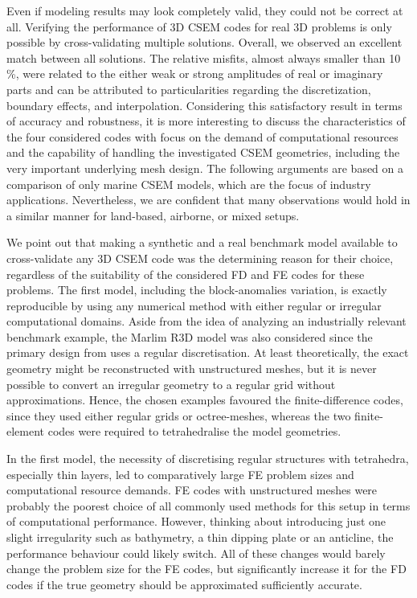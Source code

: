 \documentclass[
    paper,
  ]{geophysics}
\begin{document}
Even if modeling results may look completely valid, they could not be correct
at all. Verifying the performance of 3D CSEM codes for real 3D problems is only
possible by cross-validating multiple solutions. Overall, we observed an
excellent match between all solutions. The relative misfits, almost always
smaller than 10\,\%, were related to the either weak or strong amplitudes of
real or imaginary parts and can be attributed to particularities regarding the
discretization, boundary effects, and interpolation. Considering this
satisfactory result in terms of accuracy and robustness, it is more interesting
to discuss the characteristics of the four considered codes with focus on the
demand of computational resources and the capability of handling the
investigated CSEM geometries, including the very important underlying mesh
design. The following arguments are based on a comparison of only marine CSEM
models, which are the focus of industry applications. Nevertheless, we are
confident that many observations would hold in a similar manner for land-based,
airborne, or mixed setups. 

We point out that making a synthetic and a real benchmark model available to
cross-validate any 3D CSEM code was the determining reason for their choice,
regardless of the suitability of the considered FD and FE codes for these
problems. The first model, including the block-anomalies variation, is exactly
reproducible by using any numerical method with either regular or irregular
computational domains. Aside from the idea of analyzing an industrially
relevant benchmark example, the Marlim R3D model was also considered since the
primary design from \cite{GEO.19.Correa} uses a regular discretisation. At
least theoretically, the exact geometry might be reconstructed with
unstructured meshes, but it is never possible to convert an irregular geometry
to a regular grid without approximations. Hence, the chosen examples favoured
the finite-difference codes, since they used either regular grids or
octree-meshes, whereas the two finite-element codes were required to
tetrahedralise the model geometries.

In the first model, the necessity of discretising regular structures with
tetrahedra, especially thin layers, led to comparatively large FE problem sizes
and computational resource demands. FE codes with unstructured meshes were
probably the poorest choice of all commonly used methods for this setup in
terms of computational performance. However, thinking about introducing just
one slight irregularity such as bathymetry, a thin dipping plate or an
anticline, the performance behaviour could likely switch. All of these changes
would barely change the problem size for the FE codes, but significantly
increase it for the FD codes if the true geometry should be approximated
sufficiently accurate.
\end{document}
